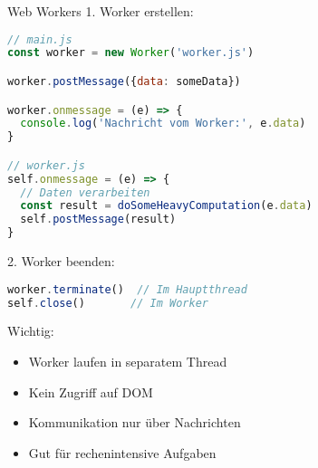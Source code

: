 \begin{KR}{Web Workers}
1. Worker erstellen:
\begin{lstlisting}[language=JavaScript, style=basesmol]
// main.js
const worker = new Worker('worker.js')

worker.postMessage({data: someData})

worker.onmessage = (e) => {
  console.log('Nachricht vom Worker:', e.data)
}

// worker.js
self.onmessage = (e) => {
  // Daten verarbeiten
  const result = doSomeHeavyComputation(e.data)
  self.postMessage(result)
}
\end{lstlisting}

2. Worker beenden:
\begin{lstlisting}[language=JavaScript, style=basesmol]
worker.terminate()  // Im Hauptthread
self.close()       // Im Worker
\end{lstlisting}

Wichtig:
\begin{itemize}
  \item Worker laufen in separatem Thread
  \item Kein Zugriff auf DOM
  \item Kommunikation nur über Nachrichten
  \item Gut für rechenintensive Aufgaben
\end{itemize}
\end{KR}